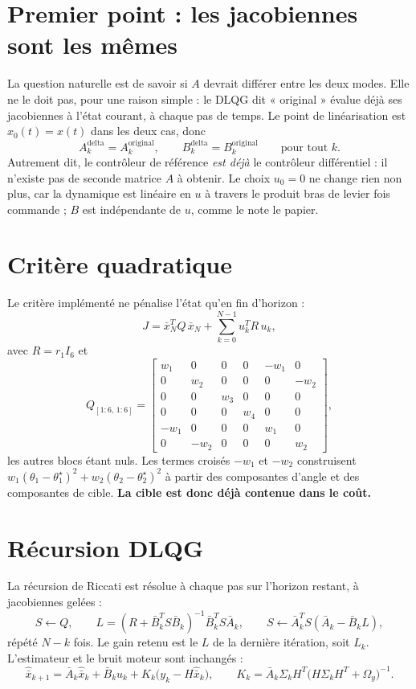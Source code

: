\documentclass[11pt,a4paper]{article}
\begin{document}
\section{Premier point : les jacobiennes sont les mêmes}
\label{sec:jacobiennes}
La question naturelle est de savoir si $A$ devrait différer entre les deux modes. Elle ne le
doit pas, pour une raison simple : le DLQG dit « original » évalue déjà ses jacobiennes à
l'état courant, à chaque pas de temps. Le point de linéarisation est $x_0(t)=x(t)$ dans les deux
cas, donc
\[
 A_k^{\text{delta}}=A_k^{\text{original}},\qquad
 B_k^{\text{delta}}=B_k^{\text{original}}\qquad\text{pour tout }k .
\]
Autrement dit, le contrôleur de référence \emph{est déjà} le contrôleur différentiel : il n'existe
pas de seconde matrice $A$ à obtenir. Le choix $u_0=0$ ne change rien non plus, car la dynamique
est linéaire en $u$ à travers le produit bras de levier fois commande ; $B$ est indépendante de
$u$, comme le note le papier.

\section{Critère quadratique}
\label{sec:cout}
Le critère implémenté ne pénalise l'état qu'en fin d'horizon :
\[
 J=\bar x_N^T Q\,\bar x_N+\sum_{k=0}^{N-1}u_k^T R\,u_k ,
\]
avec $R=r_1 I_6$ et
\[
 Q_{[1:6,\,1:6]}=\begin{bmatrix}
 w_1&0&0&0&-w_1&0\\
 0&w_2&0&0&0&-w_2\\
 0&0&w_3&0&0&0\\
 0&0&0&w_4&0&0\\
 -w_1&0&0&0&w_1&0\\
 0&-w_2&0&0&0&w_2
 \end{bmatrix},
\]
les autres blocs étant nuls. Les termes croisés $-w_1$ et $-w_2$ construisent
$w_1(\theta_1-\theta_1^\star)^2+w_2(\theta_2-\theta_2^\star)^2$ à partir des composantes
d'angle et des composantes de cible. \textbf{La cible est donc déjà contenue dans le coût.}

\section{Récursion DLQG}
La récursion de Riccati est résolue à chaque pas sur l'horizon restant, à jacobiennes gelées :
\[
 S\leftarrow Q,\qquad
 L=(R+\bar B_k^T S\bar B_k)^{-1}\bar B_k^T S\bar A_k,\qquad
 S\leftarrow \bar A_k^T S(\bar A_k-\bar B_k L),
\]
répété $N-k$ fois. Le gain retenu est le $L$ de la dernière itération, soit $L_k$.
L'estimateur et le bruit moteur sont inchangés :
\[
 \hat{\bar x}_{k+1}=\bar A_k\hat{\bar x}_k+\bar B_k u_k+K_k\big(y_k-H\hat{\bar x}_k\big),
 \qquad
 K_k=\bar A_k\Sigma_k H^T\big(H\Sigma_k H^T+\Omega_y\big)^{-1}.
\]
\end{document}
